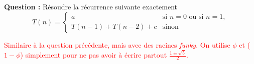\documentclass[11pt]{article} %
\newenvironment{question}[1][\unskip]{%
	\par
	\noindent
	\textbf{Question #1:}
	\noindent}
{\medskip}
\begin{document}
\section{}
\begin{question}
	Résoudre la récurrence suivante exactement
	\begin{equation*}
		T(n)=\left\{
		\begin{array}{ll}
			a & \text{si } n=0 \text{ ou si } n=1,\\
			T(n-1)+T(n-2)+c & \text{sinon }
		\end{array} \right.
	\end{equation*}	
\end{question}


\textcolor{red}{Similaire à la question précédente, mais avec des racines \textit{funky}. On utilise $\phi$ et ($1-\phi$) simplement pour ne pas avoir à écrire partout $\frac{1\pm \sqrt{5}}{2}$.}
\end{document}
